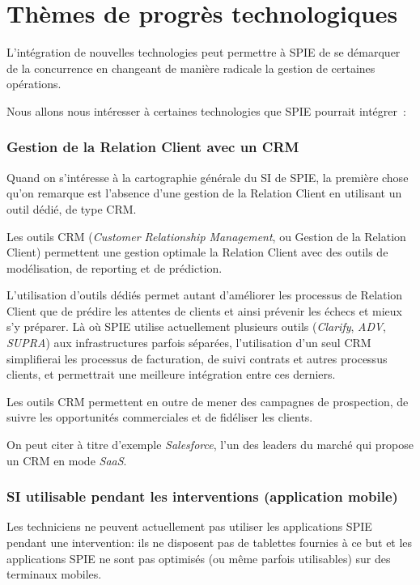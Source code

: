 \section{Thèmes de progrès technologiques}

    L'intégration de nouvelles technologies peut permettre à SPIE de se démarquer de la concurrence en changeant de manière radicale la gestion de certaines opérations.

    Nous allons nous intéresser à certaines technologies que SPIE pourrait intégrer~:

        \subsubsection{Gestion de la Relation Client avec un CRM}

            Quand on s'intéresse à la cartographie générale du SI de SPIE, la première chose qu'on remarque est l'absence d'une gestion de la Relation Client en utilisant un outil dédié, de type CRM.

            Les outils CRM (\textit{Customer Relationship Management}, ou Gestion de la Relation Client) permettent une gestion optimale la Relation Client avec des outils de modélisation, de reporting et de prédiction.

            L'utilisation d'outils dédiés permet autant d'améliorer les processus de Relation Client que de prédire les attentes de clients et ainsi prévenir les échecs et mieux s'y préparer. Là où SPIE utilise actuellement plusieurs outils (\textit{Clarify}, \textit{ADV}, \textit{SUPRA}) aux infrastructures parfois séparées, l'utilisation d'un seul CRM simplifierai les processus de facturation, de suivi contrats et autres processus clients, et permettrait une meilleure intégration entre ces derniers.

            Les outils CRM permettent en outre de mener des campagnes de prospection, de suivre les opportunités commerciales et de fidéliser les clients.

            On peut citer à titre d'exemple \textit{Salesforce}, l'un des leaders du marché qui propose un CRM en mode \textit{SaaS}.

        \subsubsection{SI utilisable pendant les interventions (application mobile)}

            Les techniciens ne peuvent actuellement pas utiliser les applications SPIE pendant une intervention: ils ne disposent pas de tablettes fournies à ce but et les applications SPIE ne sont pas optimisés (ou même parfois utilisables) sur des terminaux mobiles.


